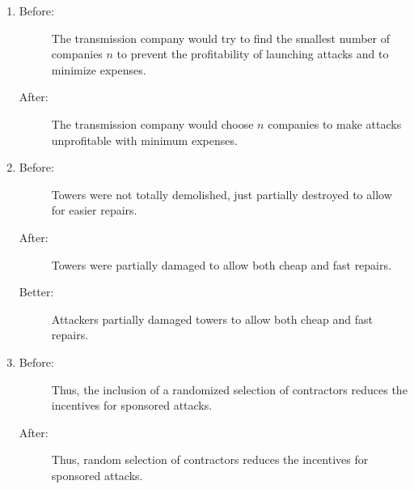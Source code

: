 \documentclass[a4paper,10pt]{article}
\newcommand{\BDTRed}[1]{{\color{red}#1}}
\newcommand{\BDTPurple}[1]{{\color{violet}#1}}
\newcommand{\BDTGreen}[1]{{\color{green}#1}}
\newcommand{\BDTBrown}[1]{{\color{brown!80!red}#1}}
\begin{document}
\begin{enumerate}
\item
\begin{description}
 \item[Before:] The \BDTGreen{transmission} company would try \BDTPurple{to} find the smallest number \BDTPurple{of} companies $n$ \BDTPurple{to} \BDTGreen{prevent} the profitability \BDTPurple{of} launching attacks \BDTRed{and} \BDTPurple{to} \BDTGreen{minimize} expenses.
  
 \item[After:] The \BDTGreen{transmission} company would choose $n$ companies \BDTPurple{to} \BDTGreen{make} attacks unprofitable \BDTPurple{with} minimum expenses.
\end{description}


\item 
\begin{description}
 \item[Before:] Towers \BDTGreen{were} \BDTBrown{not} \BDTBrown{totally} \BDTGreen{demolished,} just \BDTBrown{partially} \BDTGreen{destroyed} \BDTPurple{to} allow \BDTPurple{for} easier repairs.
 
 \item[After:] Towers \BDTGreen{were} \BDTBrown{partially} \BDTGreen{damaged} \BDTPurple{to} allow both cheap \BDTRed{and} fast repairs.
 
 \item[Better:] Attackers \BDTBrown{partially} \BDTGreen{damaged} towers \BDTPurple{to} allow both cheap \BDTRed{and} fast repairs.
\end{description}


\item
\begin{description}
 \item[Before:] Thus, the \BDTGreen{inclusion} \BDTPurple{of} a \BDTGreen{randomized} \BDTGreen{selection} \BDTPurple{of} contractors reduces the incentives \BDTPurple{for} \BDTGreen{sponsored} attacks.
 
 \item[After:] Thus, random \BDTGreen{selection} \BDTPurple{of} contractors reduces the incentives \BDTPurple{for} \BDTGreen{sponsored} attacks.
\end{description}


\end{enumerate}





\end{document}
